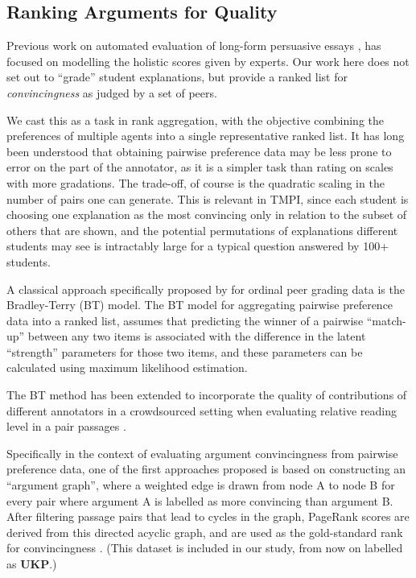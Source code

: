 \documentclass[notitlepage,12pt]{jedm}
\begin{document}
\subsection{Ranking Arguments for Quality}\label{sec:related_work:arg_quality}

Previous work on automated evaluation of long-form persuasive essays 
\cite{ghosh_coarse-grained_2016}, \cite{klebanov_argumentation_2016} 
\cite{nguyen_argument_2018} has focused on modelling the holistic scores given 
by experts.
Our work here does not set out to ``grade'' student explanations, but provide a 
ranked list for \textit{convincingness} as judged by a set of peers.

We cast this as a task in rank aggregation, with the objective combining the 
preferences of multiple agents into a single representative ranked list.
It has long been understood that obtaining pairwise preference data may be 
less prone to error on the part of the annotator, as it is a simpler task than 
rating on scales with more gradations.
The trade-off, of course is the quadratic scaling in the number of pairs one 
can generate. 
This is relevant in TMPI, since each student is choosing one explanation as 
the most convincing only in relation to the subset of others that are shown, 
and the potential permutations of explanations different students may see is 
intractably large for a typical question answered by 100+ students.

A classical approach specifically proposed by \cite{raman_methods_2014} for 
ordinal peer grading data is the Bradley-Terry (BT) model.
The BT model \cite{bradley_rank_1952} for aggregating pairwise preference data 
into a ranked list, assumes that predicting the winner of a pairwise 
``match-up'' between any two items is associated with the difference in the 
latent ``strength'' parameters for those two items, and these parameters can be 
calculated using maximum likelihood estimation.

The BT method has been extended to incorporate the quality of contributions of 
different annotators in a crowdsourced setting when evaluating relative reading 
level in a pair passages \cite{chen_pairwise_2013}. 

Specifically in the context of evaluating argument convincingness from pairwise 
preference data, one of the first approaches proposed is based on constructing 
an ``argument graph'', where a weighted edge is drawn from node A to node B for 
every pair where argument A is labelled as more convincing than argument B. 
After filtering passage pairs that lead to cycles in the graph, PageRank scores 
are derived from this directed acyclic graph, and are used as the gold-standard 
rank for convincingness \cite{habernal_which_2016}.
(This dataset is included in our study, from now on labelled as \textbf{UKP}.)
\end{document}
